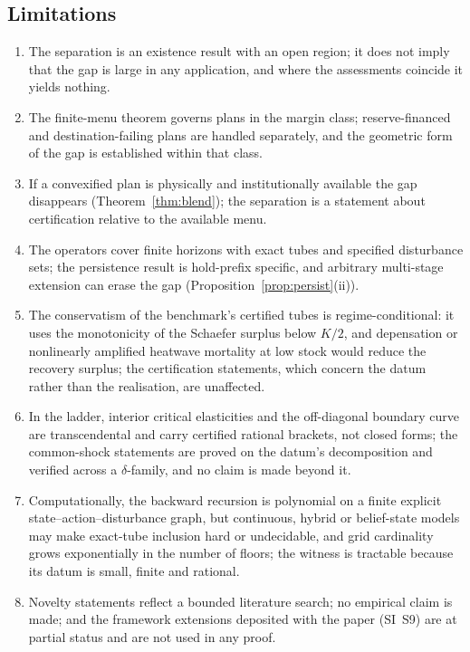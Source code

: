 \documentclass[preprint,11pt,authoryear]{elsarticle}
\theoremstyle{definition}
\theoremstyle{remark}
\begin{document}
\subsection{Limitations}\label{sec:limitations}

\begin{enumerate}[label=(\roman*),leftmargin=2em]
\item The separation is an existence result with an open region; it does not imply that the gap is large in any application, and where the assessments coincide it yields nothing.
\item The finite-menu theorem governs plans in the margin class; reserve-financed and destination-failing plans are handled separately, and the geometric form of the gap is established within that class.
\item If a convexified plan is physically and institutionally available the gap disappears (Theorem~\ref{thm:blend}); the separation is a statement about certification relative to the available menu.
\item The operators cover finite horizons with exact tubes and specified disturbance sets; the persistence result is hold-prefix specific, and arbitrary multi-stage extension can erase the gap (Proposition~\ref{prop:persist}(ii)).
\item The conservatism of the benchmark's certified tubes is regime-conditional: it uses the monotonicity of the Schaefer surplus below $K/2$, and depensation or nonlinearly amplified heatwave mortality at low stock would reduce the recovery surplus; the certification statements, which concern the datum rather than the realisation, are unaffected.
\item In the ladder, interior critical elasticities and the off-diagonal boundary curve are transcendental and carry certified rational brackets, not closed forms; the common-shock statements are proved on the datum's decomposition and verified across a $\delta$-family, and no claim is made beyond it.
\item Computationally, the backward recursion is polynomial on a finite explicit state--action--disturbance graph, but continuous, hybrid or belief-state models may make exact-tube inclusion hard or undecidable, and grid cardinality grows exponentially in the number of floors; the witness is tractable because its datum is small, finite and rational.
\item Novelty statements reflect a bounded literature search; no empirical claim is made; and the framework extensions deposited with the paper (SI~S9) are at partial status and are not used in any proof.
\end{enumerate}
\end{document}
